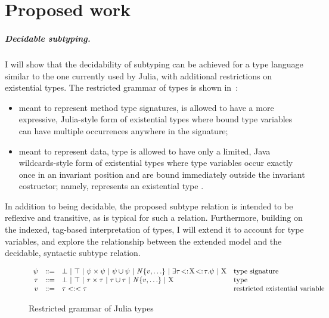 \chapter{Proposed work}\label{chap:6}

\paragraph*{Decidable subtyping.}
I will show that
the decidability of subtyping can be achieved
for a type language similar to the one currently used by Julia,
with additional restrictions on existential types.
The restricted grammar of types is shown
in~:
\begin{itemize}
  \item meant to represent method type signatures, \tysig is allowed to have
  a more expressive, Julia-style form of existential types where bound type
  variables can have multiple occurrences anywhere in the signature;
  \item meant to represent data, type \ty is allowed to have only a limited,
  Java wildcards-style form of existential types where type variables
  occur exactly once in an invariant position and are bound immediately outside
  the invariant costructor; namely,  represents
  an existential type .
\end{itemize}
In addition to being decidable, the proposed subtype relation
is intended to be reflexive and transitive,
as is typical for such a relation. Furthermore,
building on the indexed, tag-based interpretation of types, I will extend
it to account for type variables, and explore the relationship between
the extended model and the decidable, syntactic subtype relation.

\begin{figure}
\small
\[
\begin{array}{rcll}
  \psi & ::= &
    \bot ~\vert~ \top ~\vert~
    \psi \times \psi ~\vert~ \psi \cup \psi ~\vert~
    \mathit{N}\{v,\ldots\} ~\vert~
    \exists\tau\!<:\!\mathrm{X}\!<:\!\tau.\psi ~\vert~ \mathrm{X}
    & \text{type signature} \\
  \tau & ::= & 
    \bot ~\vert~ \top ~\vert~
    \tau \times \tau ~\vert~ \tau \cup \tau ~\vert~
    \mathit{N}\{v,\ldots\} ~\vert~ \mathrm{X}
    & \text{type} \\
  v & ::= &
    \tau<:<\tau
    & \text{restricted existential variable} \\
\end{array}
\]
\caption{Restricted grammar of Julia types}\label{fig:restricted-type-grammar}
\end{figure}

